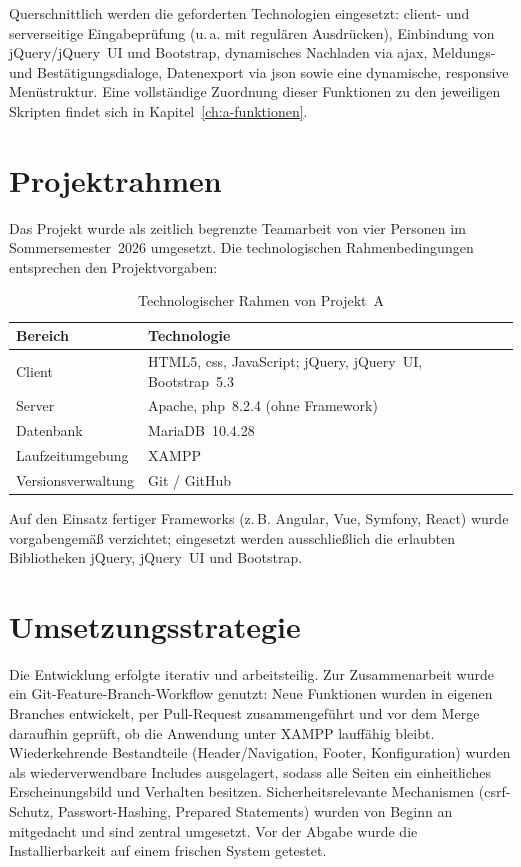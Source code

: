 Querschnittlich werden die geforderten Technologien eingesetzt: client- und serverseitige
Eingabepr\"ufung (u.\,a. mit regul\"aren Ausdr\"ucken), Einbindung von jQuery/jQuery~UI und
Bootstrap, dynamisches Nachladen via \ac{ajax}, Meldungs- und Best\"atigungsdialoge, Datenexport
via \ac{json} sowie eine dynamische, responsive Men\"ustruktur. Eine vollst\"andige Zuordnung
dieser Funktionen zu den jeweiligen Skripten findet sich in Kapitel~\ref{ch:a-funktionen}.

\section{Projektrahmen}
Das Projekt wurde als zeitlich begrenzte Teamarbeit von vier Personen im Sommersemester~2026
umgesetzt. Die technologischen Rahmenbedingungen entsprechen den Projektvorgaben:

\begin{table}[htbp]
\centering
\caption{Technologischer Rahmen von Projekt~A}
\label{tab:a-rahmen}
\begin{tabularx}{\textwidth}{@{}lX@{}}
\toprule
\textbf{Bereich} & \textbf{Technologie} \\
\midrule
Client       & HTML5, \ac{css}, JavaScript; jQuery, jQuery~UI, Bootstrap~5.3 \\
Server       & Apache, \ac{php}~8.2.4 (ohne Framework) \\
Datenbank    & MariaDB~10.4.28 \\
Laufzeitumgebung & XAMPP \\
Versionsverwaltung & Git / GitHub \\
\bottomrule
\end{tabularx}
\end{table}

Auf den Einsatz fertiger Frameworks (z.\,B. Angular, Vue, Symfony, React) wurde vorgabengem\"a\ss{}
verzichtet; eingesetzt werden ausschlie\ss{}lich die erlaubten Bibliotheken jQuery, jQuery~UI und
Bootstrap.

\section{Umsetzungsstrategie}
Die Entwicklung erfolgte iterativ und arbeitsteilig. Zur Zusammenarbeit wurde ein
Git-Feature-Branch-Workflow genutzt: Neue Funktionen wurden in eigenen Branches entwickelt,
per Pull-Request zusammengef\"uhrt und vor dem Merge daraufhin gepr\"uft, ob die Anwendung unter
XAMPP lauff\"ahig bleibt. Wiederkehrende Bestandteile (Header/Navigation, Footer, Konfiguration)
wurden als wiederverwendbare Includes ausgelagert, sodass alle Seiten ein einheitliches
Erscheinungsbild und Verhalten besitzen. Sicherheitsrelevante Mechanismen
(\ac{csrf}-Schutz, Passwort-Hashing, Prepared Statements) wurden von Beginn an mitgedacht und
sind zentral umgesetzt. Vor der Abgabe wurde die Installierbarkeit auf einem frischen System
getestet.

